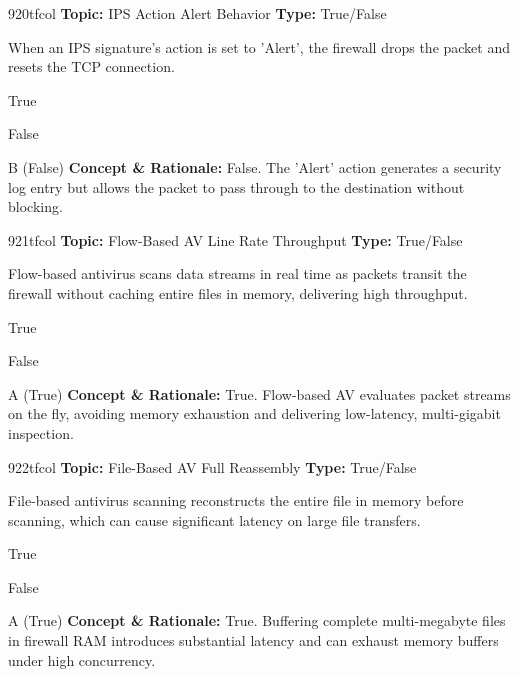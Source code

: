 \begin{qcard}{920}{tfcol}
\textcolor{darkslate!75}{\small\textbf{Topic:} IPS Action Alert Behavior \hfill \textbf{Type:} True/False}\vspace{0.4em}\par
When an IPS signature's action is set to 'Alert', the firewall drops the packet and resets the TCP connection.
\begin{qoptions}
\item True
\item False
\end{qoptions}
\end{qcard}
\nopagebreak
\begin{explainbox}{B (False)}
\textbf{Concept \& Rationale:} False. The 'Alert' action generates a security log entry but allows the packet to pass through to the destination without blocking.
\end{explainbox}

\begin{qcard}{921}{tfcol}
\textcolor{darkslate!75}{\small\textbf{Topic:} Flow-Based AV Line Rate Throughput \hfill \textbf{Type:} True/False}\vspace{0.4em}\par
Flow-based antivirus scans data streams in real time as packets transit the firewall without caching entire files in memory, delivering high throughput.
\begin{qoptions}
\item True
\item False
\end{qoptions}
\end{qcard}
\nopagebreak
\begin{explainbox}{A (True)}
\textbf{Concept \& Rationale:} True. Flow-based AV evaluates packet streams on the fly, avoiding memory exhaustion and delivering low-latency, multi-gigabit inspection.
\end{explainbox}

\begin{qcard}{922}{tfcol}
\textcolor{darkslate!75}{\small\textbf{Topic:} File-Based AV Full Reassembly \hfill \textbf{Type:} True/False}\vspace{0.4em}\par
File-based antivirus scanning reconstructs the entire file in memory before scanning, which can cause significant latency on large file transfers.
\begin{qoptions}
\item True
\item False
\end{qoptions}
\end{qcard}
\nopagebreak
\begin{explainbox}{A (True)}
\textbf{Concept \& Rationale:} True. Buffering complete multi-megabyte files in firewall RAM introduces substantial latency and can exhaust memory buffers under high concurrency.
\end{explainbox}

